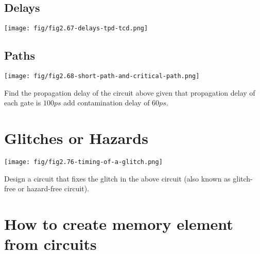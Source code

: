 \subsection{Delays}
\texttt{[image: fig/fig2.67-delays-tpd-tcd.png]}
\begin{definition}
\end{definition}
\vspace{5em}

\begin{definition}
\end{definition}
\vspace{5em}

\subsection{Paths}
\texttt{[image: fig/fig2.68-short-path-and-critical-path.png]}
\begin{example}
  Find the propagation delay of the circuit above given that propagation delay
  of each gate is $100 ps$  add contamination delay of $60ps$.
\end{example}
\vspace{10em}

\section{Glitches or Hazards}
\texttt{[image: fig/fig2.76-timing-of-a-glitch.png]}
\begin{definition}

\end{definition}
\vspace{5em}

\begin{example}
  Design a circuit that fixes the glitch in the above circuit (also known as
  glitch-free or hazard-free circuit).
\end{example}
\vspace{10em}


\section{How to create memory element from circuits}


